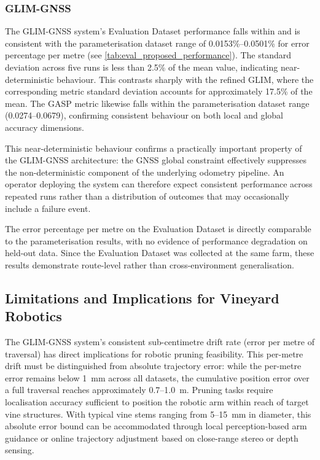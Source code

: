 \subsubsection{GLIM-GNSS}

The GLIM-GNSS system's Evaluation Dataset performance falls within and is consistent with the parameterisation dataset range of 0.0153\%--0.0501\% for error percentage per metre (see \cref{tab:eval_proposed_performance}). The standard deviation across five runs is less than 2.5\% of the mean value, indicating near-deterministic behaviour. This contrasts sharply with the refined GLIM, where the corresponding metric standard deviation accounts for approximately 17.5\% of the mean. The GASP metric likewise falls within the parameterisation dataset range (0.0274--0.0679), confirming consistent behaviour on both local and global accuracy dimensions.

This near-deterministic behaviour confirms a practically important property of the GLIM-GNSS architecture: the GNSS global constraint effectively suppresses the non-deterministic component of the underlying odometry pipeline. An operator deploying the system can therefore expect consistent performance across repeated runs rather than a distribution of outcomes that may occasionally include a failure event.

The error percentage per metre on the Evaluation Dataset is directly comparable to the parameterisation results, with no evidence of performance degradation on held-out data. Since the Evaluation Dataset was collected at the same farm, these results demonstrate route-level rather than cross-environment generalisation.

\subsection{Limitations and Implications for Vineyard Robotics}

The GLIM-GNSS system's consistent sub-centimetre drift rate (error per metre of traversal) has direct implications for robotic pruning feasibility. This per-metre drift must be distinguished from absolute trajectory error: while the per-metre error remains below 1~mm across all datasets, the cumulative position error over a full traversal reaches approximately 0.7--1.0~m. Pruning tasks require localisation accuracy sufficient to position the robotic arm within reach of target vine structures. With typical vine stems ranging from 5--15~mm in diameter, this absolute error bound can be accommodated through local perception-based arm guidance or online trajectory adjustment based on close-range stereo or depth sensing.

